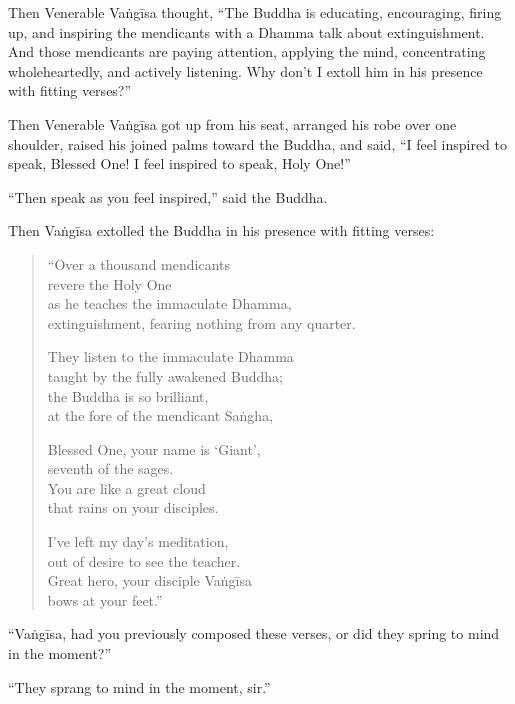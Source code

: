 \documentclass[12pt,openany]{book}%
\begin{document}
Then Venerable \textsanskrit{Vaṅgīsa} thought, “The Buddha is educating, encouraging, firing up, and inspiring the mendicants with a Dhamma talk about extinguishment. And those mendicants are paying attention, applying the mind, concentrating wholeheartedly, and actively listening. Why don’t I extoll him in his presence with fitting verses?” 

Then Venerable \textsanskrit{Vaṅgīsa} got up from his seat, arranged his robe over one shoulder, raised his joined palms toward the Buddha, and said, “I feel inspired to speak, Blessed One! I feel inspired to speak, Holy One!” 

“Then speak as you feel inspired,” said the Buddha. 

Then \textsanskrit{Vaṅgīsa} extolled the Buddha in his presence with fitting verses: 

\begin{verse}%
“Over a thousand mendicants \\
revere the Holy One \\
as he teaches the immaculate Dhamma, \\
extinguishment, fearing nothing from any quarter. 

They listen to the immaculate Dhamma \\
taught by the fully awakened Buddha; \\
the Buddha is so brilliant, \\
at the fore of the mendicant \textsanskrit{Saṅgha}, 

Blessed One, your name is ‘Giant’, \\
seventh of the sages. \\
You are like a great cloud \\
that rains on your disciples. 

I’ve left my day’s meditation, \\
out of desire to see the teacher. \\
Great hero, your disciple \textsanskrit{Vaṅgīsa} \\
bows at your feet.” 

%
\end{verse}

“\textsanskrit{Vaṅgīsa}, had you previously composed these verses, or did they spring to mind in the moment?” 

“They sprang to mind in the moment, sir.” 
\end{document}
